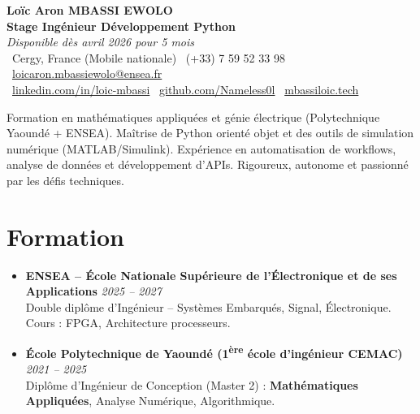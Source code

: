 \documentclass[a4paper,11pt]{article}
\begin{document}
\begin{center}
    {\Large \textbf{Loïc Aron MBASSI EWOLO}} \\ \vspace{4pt}
    \textbf{\large Stage Ingénieur Développement Python} \\
    \textit{\small Disponible dès avril 2026 pour 5 mois} \\ \vspace{4pt}
    \small
    \faMapMarker\ Cergy, France (Mobile nationale) \quad
    \faPhone\ (+33) 7 59 52 33 98 \quad
    {\color{primary}\faEnvelope\ \href{mailto:loicaron.mbassiewolo@ensea.fr}{loicaron.mbassiewolo@ensea.fr}} \\ \vspace{2pt}
    {\color{primary}\faLinkedin\ \href{https://www.linkedin.com/in/loic-mbassi/}{linkedin.com/in/loic-mbassi}} \quad
    {\color{primary}\faGithub\ \href{https://github.com/Nameless0l}{github.com/Nameless0l}} \quad
    {\color{primary}\faGlobe\ \href{https://mbassiloic.tech}{mbassiloic.tech}}
\end{center}

\vspace{-6pt}

\noindent\small{Formation en mathématiques appliquées et génie électrique (Polytechnique Yaoundé + ENSEA). Maîtrise de Python orienté objet et des outils de simulation numérique (MATLAB/Simulink). Expérience en automatisation de workflows, analyse de données et développement d'APIs. Rigoureux, autonome et passionné par les défis techniques.}

\section{Formation}
\begin{itemize}[leftmargin=*, label=\tiny$\bullet$, nosep]
    \item \textbf{ENSEA -- École Nationale Supérieure de l'Électronique et de ses Applications} \hfill \textit{2025 -- 2027} \\
    \small{Double diplôme d'Ingénieur -- Systèmes Embarqués, Signal, Électronique. Cours : FPGA, Architecture processeurs.}
    \item \textbf{École Polytechnique de Yaoundé (1\textsuperscript{ère} école d'ingénieur CEMAC)} \hfill \textit{2021 -- 2025} \\
    \small{Diplôme d'Ingénieur de Conception (Master 2) : \textbf{Mathématiques Appliquées}, Analyse Numérique, Algorithmique.}
\end{itemize}
\end{document}
